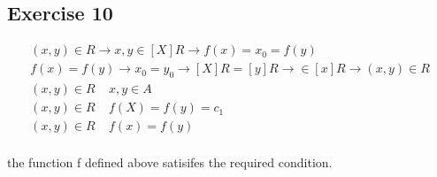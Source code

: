 \documentclass[12pt]{article}
\begin{document}
\subsection*{Exercise 10}
\begin{center}
\begin{equation}\nonumber
    \begin{aligned}
    (x,y)\in R \rightarrow x,y \in [X]R \rightarrow f(x)=x_0=f(y)\\
    f(x)=f(y)\rightarrow x_0=y_0\rightarrow[X]R=[y]R\rightarrow\in [x]R\rightarrow(x,y)\in R\\
    (x,y)\in R~~~~~x,y\in A\\
    (x,y)\in R~~~~~f(X)=f(y)=c_1\\
    (x,y)\in R~~~~~f(x)=f(y)\\
    \end{aligned}
\end{equation}
\end{center}
the function f defined above satisifes the required condition.\\
\\
\end{document}
